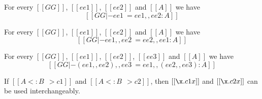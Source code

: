 \begin{corollary} \label{lemma:neutral}
  For every $[[GG]]$, $[[ee1]]$, $[[ee2]]$ and $[[A]]$ we have
  \[
  [[GG |- ee1 ~= ee1 ,, ee2 : A]]
  \]
\end{corollary}

\begin{corollary} \label{lemma:commu}
  For every $[[GG]]$, $[[ee1]]$, $[[ee2]]$ and $[[A]]$ we have
  \[
  [[GG |- ee1 ,, ee2 ~= ee2 ,, ee1 : A]]
  \]
\end{corollary}


\begin{corollary} \label{lemma:assoc}
  For every $[[GG]]$, $[[ee1]]$, $[[ee2]]$, $[[ee3]]$ and $[[A]]$ we have
  \[
  [[GG |- (ee1 ,, ee2) ,, ee3 ~= ee1 ,, (ee2 ,, ee3) : A]]
  \]
\end{corollary}



\begin{corollary}
  \label{lemma:coercion_same}
  If $[[A <: B ~~> c1]]$ and $[[A <: B ~~> c2]]$, then $[[\x . c1 x]]$ and $[[\x
  . c2 x]]$ can be used interchangeably.
\end{corollary}


